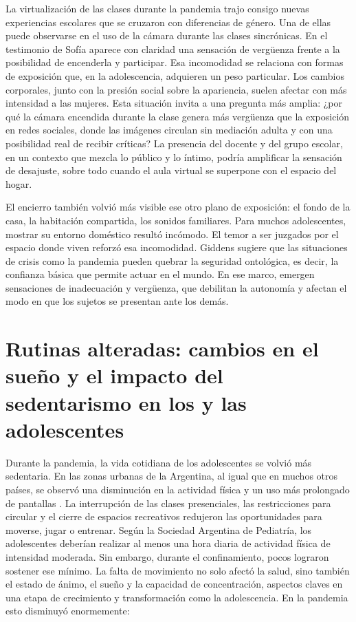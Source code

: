 \begin{refsection}
\begin{gbcita}
\end{gbcita}

La virtualización de las clases durante la pandemia trajo consigo nuevas experiencias escolares que se cruzaron con diferencias de género. Una de ellas puede observarse en el uso de la cámara durante las clases sincrónicas. En el testimonio de Sofía aparece con claridad una sensación de vergüenza frente a la posibilidad de encenderla y participar. Esa incomodidad se relaciona con formas de exposición que, en la adolescencia, adquieren un peso particular. Los cambios corporales, junto con la presión social sobre la apariencia, suelen afectar con más intensidad a las mujeres. Esta situación invita a una pregunta más amplia: ¿por qué la cámara encendida durante la clase genera más vergüenza que la exposición en redes sociales, donde las imágenes circulan sin mediación adulta y con una posibilidad real de recibir críticas? La presencia del docente y del grupo escolar, en un contexto que mezcla lo público y lo íntimo, podría amplificar la sensación de desajuste, sobre todo cuando el aula virtual se superpone con el espacio del hogar.

El encierro también volvió más visible ese otro plano de exposición: el fondo de la casa, la habitación compartida, los sonidos familiares. Para muchos adolescentes, mostrar su entorno doméstico resultó incómodo. El temor a ser juzgados por el espacio donde viven reforzó esa incomodidad. Giddens \protect\parencite*{4201-GIDDENS1997} sugiere que las situaciones de crisis como la pandemia pueden quebrar la seguridad ontológica, es decir, la confianza básica que permite actuar en el mundo. En ese marco, emergen sensaciones de inadecuación y vergüenza, que debilitan la autonomía y afectan el modo en que los sujetos se presentan ante los demás.


\section[Rutinas alteradas: cambios en el sueño y el impacto del sedentarismo en los y las adolescentes]{Rutinas alteradas: cambios en el sueño y el impacto del sedentarismo en los y las adolescentes}
\label{cap-26.rutinas-alteradas-cambios-en-el-sueno-y-el-impacto-del-sedentarismo-en-los-y-las-adolescentes}
Durante la pandemia, la vida cotidiana de los adolescentes se volvió más sedentaria. En las zonas urbanas de la Argentina, al igual que en muchos otros países, se observó una disminución en la actividad física y un uso más prolongado de pantallas \protect\parencite{4230-SIMONI2022}. La interrupción de las clases presenciales, las restricciones para circular y el cierre de espacios recreativos redujeron las oportunidades para moverse, jugar o entrenar. Según la Sociedad Argentina de Pediatría, los adolescentes deberían realizar al menos una hora diaria de actividad física de intensidad moderada. Sin embargo, durante el confinamiento, pocos lograron sostener ese mínimo. La falta de movimiento no solo afectó la salud, sino también el estado de ánimo, el sueño y la capacidad de concentración, aspectos claves en una etapa de crecimiento y transformación como la adolescencia. En la pandemia esto disminuyó enormemente:



\end{refsection}
